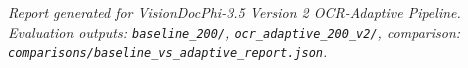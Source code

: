 \documentclass[11pt,a4paper]{article}
\begin{document}
\vspace{0.8cm}
\begin{center}
\small
\textit{Report generated for VisionDocPhi-3.5 Version 2 OCR-Adaptive Pipeline. Evaluation outputs: \texttt{baseline\_200/}, \texttt{ocr\_adaptive\_200\_v2/}, comparison: \texttt{comparisons/baseline\_vs\_adaptive\_report.json}.}
\end{center}
\end{document}
